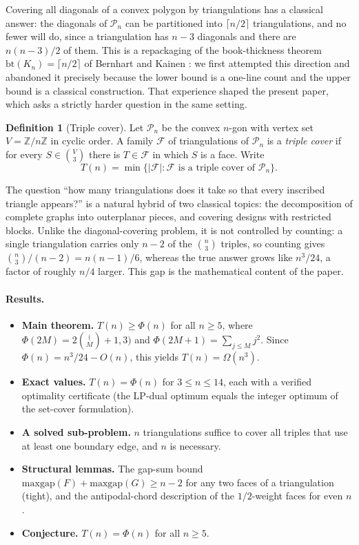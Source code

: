 \documentclass[11pt,a4paper]{article}
\theoremstyle{definition}
\newtheorem{definition}[theorem]{Definition}
\newcommand{\Pol}{\mathcal{P}}
\newcommand{\Zn}{\mathbb{Z}}
\newcommand{\maxgap}{\mathrm{maxgap}}
\begin{document}
Covering all diagonals of a convex polygon by triangulations has a classical
answer: the diagonals of $\Pol_n$ can be partitioned into $\lceil n/2\rceil$
triangulations, and no fewer will do, since a triangulation has $n-3$ diagonals
and there are $n(n-3)/2$ of them. This is a repackaging of the book-thickness
theorem $\mathrm{bt}(K_n) = \lceil n/2\rceil$ of Bernhart and Kainen
\cite{bernhartkaainen1979}: we first attempted this direction and abandoned it
precisely because the lower bound is a one-line count and the upper bound is a
classical construction. That experience shaped the present paper, which asks a
strictly harder question in the same setting.

\begin{definition}[Triple cover]\label{def:triplecover}
Let $\Pol_n$ be the convex $n$-gon with vertex set $V = \Zn/n\Zn$ in cyclic order. A
family $\mathcal{F}$ of triangulations of $\Pol_n$ is a \emph{triple cover} if for
every $S \in \binom{V}{3}$ there is $T \in \mathcal{F}$ in which $S$ is a face.
Write
\[
T(n) = \min\{|\mathcal{F}| : \mathcal{F} \text{ is a triple cover of } \Pol_n\}.
\]
\end{definition}

The question ``how many triangulations does it take so that every inscribed
triangle appears?'' is a natural hybrid of two classical topics: the
decomposition of complete graphs into outerplanar pieces, and covering designs
with restricted blocks. Unlike the diagonal-covering problem, it is not
controlled by counting: a single triangulation carries only $n-2$ of the
$\binom{n}{3}$ triples, so counting gives $\binom{n}{3}/(n-2) = n(n-1)/6$, whereas
the true answer grows like $n^3/24$, a factor of roughly $n/4$ larger. This gap
is the mathematical content of the paper.

\paragraph{Results.}
\begin{itemize}[leftmargin=1.4em]
\item \textbf{Main theorem.} $T(n) \ge \Phi(n)$ for all $n \ge 5$, where
      $\Phi(2M) = 2\binom(M+1,3)$ and $\Phi(2M+1) = \sum_{j\le M} j^2$. Since
      $\Phi(n) = n^3/24 - O(n)$, this yields $T(n) = \Omega(n^3)$.
\item \textbf{Exact values.} $T(n) = \Phi(n)$ for $3 \le n \le 14$, each with a
      verified optimality certificate (the LP-dual optimum equals the integer
      optimum of the set-cover formulation).
\item \textbf{A solved sub-problem.} $n$ triangulations suffice to cover all
      triples that use at least one boundary edge, and $n$ is necessary.
\item \textbf{Structural lemmas.} The gap-sum bound $\maxgap(F) + \maxgap(G) \ge
      n-2$ for any two faces of a triangulation (tight), and the antipodal-chord
      description of the $1/2$-weight faces for even $n$.
\item \textbf{Conjecture.} $T(n) = \Phi(n)$ for all $n \ge 5$.
\end{itemize}
\end{document}
